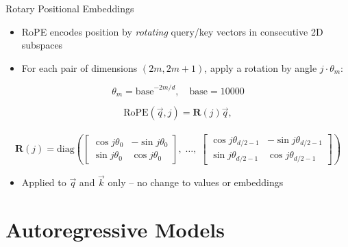 \documentclass[11pt,compress,t,notes=noshow, xcolor=table]{beamer}
\begin{document}
\begin{frame}{Rotary Positional Embeddings}

\vfill

\begin{itemize}
\item RoPE encodes position by \textit{rotating} query/key vectors in consecutive 2D subspaces
\item For each pair of dimensions $(2m, 2m+1)$, apply a rotation by angle $j \cdot \theta_m$:
\end{itemize}

\begin{equation*}
\theta_m = \text{base}^{-2m/d}, \quad \text{base} = 10000
\end{equation*}

{\footnotesize
$$
\mathrm{RoPE}(\vec q, j) = \mathbf{R}(j)\vec q,
$$\\
$$
\mathbf{R}(j) = \mathrm{diag}\!\left(
\begin{bmatrix}\cos j\theta_0 & -\sin j\theta_0 \\ \sin j\theta_0 & \cos j\theta_0\end{bmatrix},
\;\ldots,\;
\begin{bmatrix}\cos j\theta_{d/2-1} & -\sin j\theta_{d/2-1} \\ \sin j\theta_{d/2-1} & \cos j\theta_{d/2-1}\end{bmatrix}
\right)
$$
} 

\begin{itemize}
\item Applied to $\vec q$ and $\vec k$ only -- no change to values or embeddings
\end{itemize}

\vfill

\end{frame}


\section{Autoregressive Models}
\end{document}
